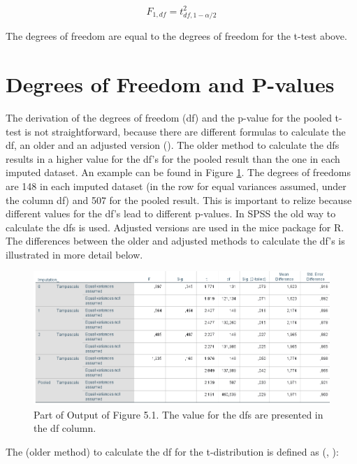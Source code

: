 \documentclass[]{book}
\begin{document}
\begin{equation}
F_{1, df}=t^2_{df,1-\alpha/2}
  \label{eq:f-distr}
\end{equation}

The degrees of freedom are equal to the degrees of freedom for the
t-test above.

\section{Degrees of Freedom and
P-values}\label{degrees-of-freedom-and-p-values}

The derivation of the degrees of freedom (df) and the p-value for the
pooled t-test is not straightforward, because there are different
formulas to calculate the df, an older and an adjusted version
(\citet{VanBuuren2018}). The older method to calculate the dfs results
in a higher value for the df's for the pooled result than the one in
each imputed dataset. An example can be found in Figure
\ref{fig:tab9-3}. The degrees of freedoms are 148 in each imputed
dataset (in the row for equal variances assumed, under the column df)
and 507 for the pooled result. This is important to relize because
different values for the df's lead to different p-values. In SPSS the
old way to calculate the dfs is used. Adjusted versions are used in the
mice package for R. The differences between the older and adjusted
methods to calculate the df's is illustrated in more detail below.

\begin{figure}

{\centering \includegraphics[width=0.9\linewidth]{images/table5.2} 

}

\caption{Part of Output of Figure 5.1. The value for the dfs are presented in the df column.}\label{fig:tab9-3}
\end{figure}

The (older method) to calculate the df for the t-distribution is defined
as (\citet{Rubin1987}, \citet{VanBuuren2018}):
\end{document}
